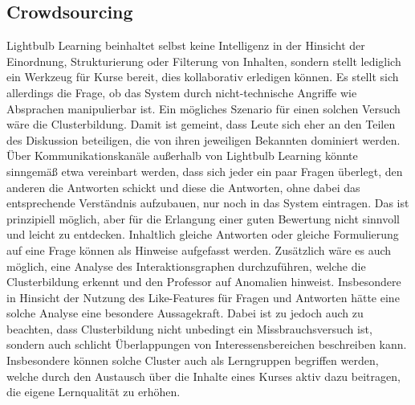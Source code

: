 \subsection{Crowdsourcing}
Lightbulb Learning beinhaltet selbst keine Intelligenz in der Hinsicht der Einordnung, Strukturierung oder Filterung von Inhalten, sondern stellt lediglich ein Werkzeug für Kurse bereit, dies kollaborativ erledigen können. Es stellt sich allerdings die Frage, ob das System durch nicht-technische Angriffe wie Absprachen manipulierbar ist. Ein mögliches Szenario für einen solchen Versuch wäre die Clusterbildung. Damit ist gemeint, dass Leute sich eher an den Teilen des Diskussion beteiligen, die von ihren jeweiligen Bekannten dominiert werden. Über Kommunikationskanäle außerhalb von Lightbulb Learning könnte sinngemäß etwa vereinbart werden, dass sich jeder ein paar Fragen überlegt, den anderen die Antworten schickt und diese die Antworten, ohne dabei das entsprechende Verständnis aufzubauen, nur noch in das System eintragen. Das ist prinzipiell möglich, aber für die Erlangung einer guten Bewertung nicht sinnvoll und leicht zu entdecken. Inhaltlich gleiche Antworten oder gleiche Formulierung auf eine Frage können als Hinweise aufgefasst werden. Zusätzlich wäre es auch möglich, eine Analyse des Interaktionsgraphen durchzuführen, welche die Clusterbildung erkennt und den Professor auf Anomalien hinweist. Insbesondere in Hinsicht der Nutzung des Like-Features für Fragen und Antworten hätte eine solche Analyse eine besondere Aussagekraft. Dabei ist zu jedoch auch zu beachten, dass Clusterbildung nicht unbedingt ein Missbrauchsversuch ist, sondern auch schlicht Überlappungen von Interessensbereichen beschreiben kann. Insbesondere können solche Cluster auch als Lerngruppen begriffen werden, welche durch den Austausch über die Inhalte eines Kurses aktiv dazu beitragen, die eigene Lernqualität zu erhöhen.

